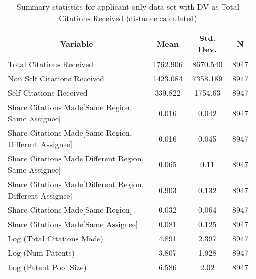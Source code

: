 
\begin{table}[htbp]\centering \caption{Summary statistics for applicant only data set with DV as Total Citations Received (distance calculated) \label{a.tsummary}}
\scriptsize
\singlespacing
\begin{tabular}{l c c  c}\hline\hline
\multicolumn{1}{c}{\textbf{Variable}} & \textbf{Mean}
 & \textbf{Std. Dev.} & \textbf{N}\\ \hline
Total Citations Received & 1762.906 & 8670.540  & 8947\\
Non-Self Citations Received & 1423.084 & 7358.189  & 8947\\
Self Citations Received & 339.822 & 1754.63  & 8947\\
Share Citations Made[Same Region, Same Assignee] & 0.016 & 0.042  & 8947\\
Share Citations Made[Same Region, Different Assignee] & 0.016 & 0.045  & 8947\\
Share Citations Made[Different Region, Same Assignee] & 0.065 & 0.11  & 8947\\
Share Citations Made[Different Region, Different Assignee] & 0.903 & 0.132  & 8947\\
Share Citations Made[Same Region] & 0.032 & 0.064  & 8947\\
Share Citations Made[Same Assignee] & 0.081 & 0.125  & 8947\\
Log (Total Citations Made) & 4.891 & 2.397  & 8947\\
Log (Num Patents) & 3.807 & 1.928  & 8947\\
Log (Patent Pool Size) & 6.586 & 2.02  & 8947\\
\hline\end{tabular}
\end{table}
